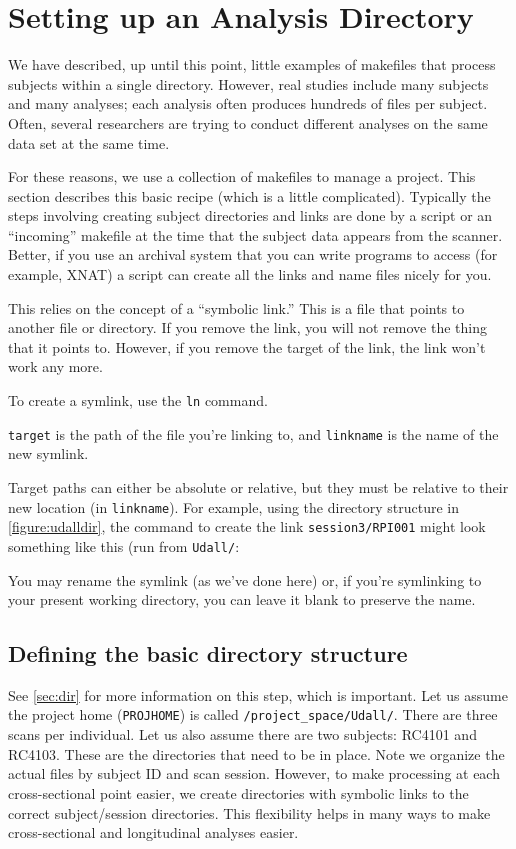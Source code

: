 \section{Setting up an Analysis Directory}
\label{sec:analysisdir}

We have described, up until this point, little examples of makefiles that process subjects within a single directory. However, real studies include many subjects and many analyses; each analysis often produces hundreds of files per subject. Often, several researchers are trying to conduct different analyses on the same data set at the same time.

For these reasons, we use a collection of makefiles to manage a project. This section describes this basic recipe (which is a little complicated). Typically the steps involving creating subject directories and links are done by a script or an ``incoming'' makefile at the time that the subject data appears from the scanner. Better, if you use an archival system that you can write programs to access (for example, XNAT) a script can create all the links and name files nicely for you.

This relies on the concept of a ``symbolic link.'' This is a file that points to another file or directory. If you remove the link, you will not remove the thing that it points to. However, if you remove the target of the link, the link won't work any more.

To create a symlink, use the \texttt{ln} command.

\texttt{target} is the path of the file you're linking to, and \texttt{linkname} is the name of the new symlink.

Target paths can either be absolute or relative, but they must be relative to their new location (in \texttt{linkname}). For example, using the directory structure in \autoref{figure:udalldir}, the command to create the link \texttt{session3/RPI001} might look something like this (run from \texttt{Udall/}:

You may rename the symlink (as we've done here) or, if you're symlinking to your present working directory, you can leave it blank to preserve the name.

\subsection{Defining the basic directory structure}
See \autoref{sec:dir} for more information on this step, which is important. Let us assume the project home (\texttt{PROJHOME}) is called \texttt{/project_space/Udall/}. There are three scans per individual. Let us also assume there are two subjects: RC4101 and RC4103. These are the directories that need to be in place. Note we organize the actual files by subject ID and scan session. However, to make processing at each cross-sectional point easier, we create directories with symbolic links to the correct subject/session directories. This flexibility helps in many ways to make cross-sectional and longitudinal analyses easier.

